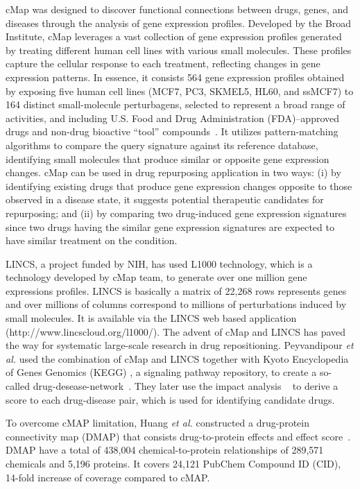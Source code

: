 cMap was designed to discover functional connections between drugs, genes, and diseases through the analysis of gene expression profiles. Developed by the Broad Institute, cMap leverages a vast collection of gene expression profiles generated by treating different human cell lines with various small molecules. These profiles capture the cellular response to each treatment, reflecting changes in gene expression patterns.
In essence, it consists 564 gene expression profiles obtained by exposing five human cell lines (MCF7, PC3, SKMEL5, HL60, and ssMCF7) to 164 distinct small-molecule perturbagens, selected to represent a broad range of activities, and including U.S. Food and Drug Administration (FDA)–approved drugs and non-drug bioactive “tool” compounds~\cite{lamb2006connectivity}. 
It utilizes pattern-matching algorithms to compare the query signature against its reference database, identifying small molecules that produce similar or opposite gene expression changes.
cMap can be used in drug repurposing application in two ways: (i) by identifying existing drugs that produce gene expression changes opposite to those observed in a disease state, it suggests potential therapeutic candidates for repurposing; and (ii) by comparing two drug-induced gene expression signatures since two drugs having the similar gene expression signatures are expected to have similar treatment on the condition.

LINCS, a project funded by NIH, has used L1000 technology, which is a technology developed by cMap team, to generate over one million gene expressions profiles. LINCS is basically a matrix of 22,268 rows represents genes and over millions of columns correspond to millions of perturbations induced by small molecules. It is available via the LINCS web based application (http://www.lincscloud.org/l1000/). The advent of cMap and LINCS has paved the way for systematic large-scale research in drug repositioning.  Peyvandipour \textit{et al.} used the combination of cMap and LINCS together with Kyoto Encyclopedia of Genes Genomics (KEGG) \cite{ogata1999kegg}, a signaling pathway repository, to create a so-called drug-desease-network~\cite{peyvandipour2018novel}. They later use the impact analysis ~\cite{draghici2007systems} to derive a score to each drug-disease pair, which is used for identifying candidate drugs.

To overcome cMAP limitation, Huang \textit{et al.} constructed a drug-protein connectivity map (DMAP) that consists drug-to-protein effects and effect score~\cite{huang2015dmap}. DMAP have a total of 438,004 chemical-to-protein relationships of 289,571 chemicals and 5,196 proteins. It covers 24,121 PubChem Compound ID (CID), 14-fold increase of coverage compared to cMAP. 

